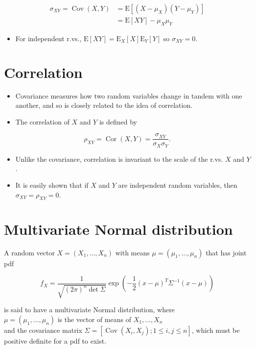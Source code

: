 \documentclass[10pt]{article}
\begin{document}
$$
\begin{aligned}
\sigma_{X Y}=\operatorname{Cov}(X, Y) & =\mathrm{E}\left[\left(X-\mu_{X}\right)\left(Y-\mu_{Y}\right)\right] \\
& =\mathrm{E}[X Y]-\mu_{X} \mu_{Y}
\end{aligned}
$$

\begin{itemize}
  \item For independent r.vs., $\mathrm{E}[X Y]=\mathrm{E}_{X}[X] \mathrm{E}_{Y}[Y]$ so $\sigma_{X Y}=0$.
\end{itemize}

\section*{Correlation}
\begin{itemize}
  \item Covariance measures how two random variables change in tandem with one another, and so is closely related to the idea of correlation.
  \item The correlation of $X$ and $Y$ is defined by
\end{itemize}

$$
\rho_{X Y}=\operatorname{Cor}(X, Y)=\frac{\sigma_{X Y}}{\sigma_{X} \sigma_{Y}} .
$$

\begin{itemize}
  \item Unlike the covariance, correlation is invariant to the scale of the r.vs. $X$ and $Y$.
  \item It is easily shown that if $X$ and $Y$ are independent random variables, then $\sigma_{X Y}=\rho_{X Y}=0$.
\end{itemize}

\section*{Multivariate Normal distribution}
A random vector $X=\left(X_{1}, \ldots, X_{n}\right)$ with means $\mu=\left(\mu_{1}, \ldots, \mu_{n}\right)$ that has joint pdf

$$
f_{X}=\frac{1}{\sqrt{(2 \pi)^{n} \operatorname{det} \Sigma}} \exp \left(-\frac{1}{2}(x-\mu)^{T} \Sigma^{-1}(x-\mu)\right)
$$

is said to have a multivariate Normal distribution, where\\
$\mu=\left(\mu_{1}, \ldots, \mu_{n}\right)$ is the vector of means of $X_{1}, \ldots, X_{n}$\\
and the covariance matrix $\Sigma=\left[\operatorname{Cov}\left(X_{i}, X_{j}\right) ; 1 \leq i, j \leq n\right]$, which must be positive definite for a pdf to exist.
\end{document}
